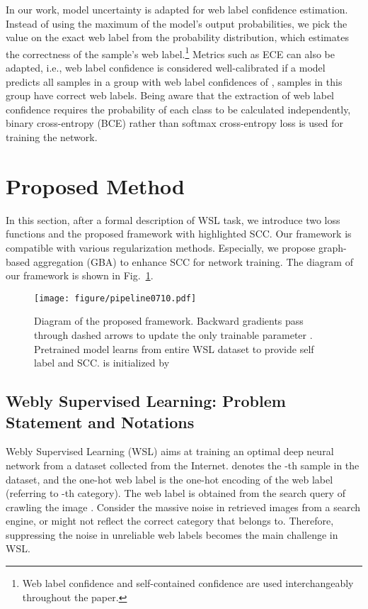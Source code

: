\documentclass[runningheads]{llncs}
\begin{document}
In our work, model uncertainty is adapted for web label confidence estimation. Instead of using the maximum of the model's output probabilities, we pick the value on the exact web label from the probability distribution, which estimates the correctness of the sample's web label.\footnote{Web label confidence and self-contained confidence are used interchangeably throughout the paper.} Metrics such as ECE can also be adapted, i.e., web label confidence is considered well-calibrated if a model predicts all samples in a group with web label confidences of ,  samples in this group have correct web labels. Being aware that the extraction of web label confidence requires the probability of each class to be calculated independently, binary cross-entropy (BCE) rather than softmax cross-entropy loss is used for training the network. 



\section{Proposed Method}
In this section, after a formal description of WSL task, we introduce two loss functions and the proposed framework with highlighted SCC. Our framework is compatible with various regularization methods. Especially, we propose graph-based aggregation (GBA) to enhance SCC for network training. The diagram of our framework is shown in Fig.~\ref{Fig:pipeline}.
	
\begin{figure}[t]
	\centering
	\texttt{[image: figure/pipeline0710.pdf]}
	\smallskip
	\caption{Diagram of the proposed framework. Backward gradients pass through dashed arrows to update the only trainable parameter . Pretrained model  learns from entire WSL dataset to provide self label and SCC.  is initialized by }
	\label{Fig:pipeline}
\end{figure}
	
\subsection{Webly Supervised Learning: Problem Statement and Notations}
\label{S:method-problem}
Webly Supervised Learning (WSL) aims at training an optimal deep neural network  from a dataset  collected from the Internet.
 denotes the -th sample in the dataset, and the one-hot web label  is the one-hot encoding of the web label  (referring to -th category). The web label  is obtained from the search query of crawling the image . Consider the massive noise in retrieved images from a search engine,  or  might not reflect the correct category that  belongs to. Therefore, suppressing the noise in unreliable web labels becomes the main challenge in WSL.
\end{document}
